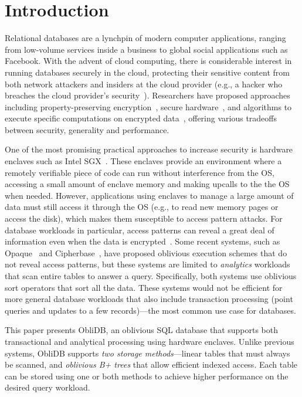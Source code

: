 \documentclass[letterpaper,twocolumn,10pt]{article}
\def\name/{ObliDB}
\begin{document}
\section{Introduction}

Relational databases are a lynchpin of modern computer applications, ranging from low-volume services inside a business to global social applications such as Facebook.
With the advent of cloud computing, there is considerable interest in running databases securely in the cloud, protecting their sensitive content from both network attackers and insiders at the cloud provider (e.g., a hacker who breaches the cloud provider's security~\cite{yahoo-hack}).
Researchers have proposed approaches including property-preserving encryption~\cite{PRZB12,mylar,FVY+17}, secure hardware~\cite{cipherbase,ZDB+17}, and algorithms to execute specific computations on encrypted data~\cite{WZPM16,NWI+13}, offering various tradeoffs between security, generality and performance.

One of the most promising practical approaches to increase security is hardware enclaves such as Intel SGX~\cite{CD16}.
These enclaves provide an environment where a remotely verifiable piece of code can run without interference from the OS, accessing a small amount of enclave memory and making upcalls to the the OS when needed.
However, applications using enclaves to manage a large amount of data must still access it through the OS (e.g., to read new memory pages or access the disk), which makes them susceptible to access pattern attacks.
For database workloads in particular, access patterns can reveal a great deal of information even when the data is encrypted~\cite{IKK12,NKW15,CGPR15}. %
Some recent systems, such as Opaque~\cite{ZDB+17} and Cipherbase~\cite{cipherbase}, have proposed oblivious execution schemes that do not reveal access patterns, but these systems are limited to \emph{analytics} workloads that scan entire tables to answer a query.
Specifically, both systems use oblivious sort operators that sort all the data.
These systems would not be efficient for more general database workloads that also include transaction processing (point queries and updates to a few records)---the most common use case for databases.

This paper presents \name/, an oblivious SQL database that supports both transactional and analytical processing using hardware enclaves. Unlike previous systems, \name/ supports \emph{two storage methods}---linear tables that must always be scanned, and \emph{oblivious B+ trees} that allow efficient indexed access. Each table can be stored using one or both methods to achieve higher performance on the desired query workload.
\end{document}
